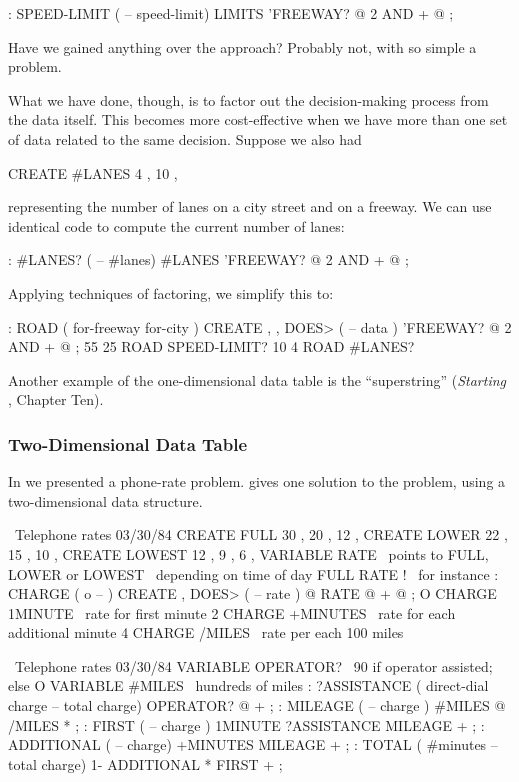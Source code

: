 \begin{Code}
: SPEED-LIMIT  ( -- speed-limit)
     LIMITS  'FREEWAY? @  2 AND  +  @ ;
\end{Code}
Have we gained anything over the  approach? Probably not,
with so simple a problem.

What we have done, though, is to factor out the decision-making
process from the data itself. This becomes more cost-effective when we
have more than one set of data related to the same decision. Suppose we
also had

\begin{Code}
CREATE #LANES   4 ,  10 ,
\end{Code}
representing the number of lanes on a city street and on a freeway. We
can use identical code to compute the current number of lanes:

\begin{Code}
: #LANES?  ( -- #lanes)
     #LANES  'FREEWAY? @  2 AND  +  @ ;
\end{Code}
Applying techniques of factoring, we simplify this to:

\begin{Code}
: ROAD  ( for-freeway for-city ) CREATE , ,
     DOES> ( -- data )  'FREEWAY? @  2 AND  +  @ ;
55 25 ROAD SPEED-LIMIT?
10  4 ROAD #LANES?
\end{Code}
Another example of the one-dimensional data table is the ``superstring''
(\emph{Starting \Forth{}}, Chapter Ten).

\subsubsection{Two-Dimensional Data Table}
In  we presented a phone-rate problem.  gives one
solution to the problem, using a two-dimensional data structure.

\begin{figure*}[bbbt]
\begin{Screen}
\ Telephone rates                                       03/30/84
CREATE FULL     30 , 20 , 12 ,
CREATE LOWER    22 , 15 , 10 ,
CREATE LOWEST   12 ,  9 ,  6 ,
VARIABLE RATE   \ points to FULL, LOWER or LOWEST
                \ depending on time of day
FULL RATE !  \ for instance
: CHARGE   ( o -- ) CREATE ,
   DOES>  ( -- rate )  @  RATE @ +  @ ;
O CHARGE 1MINUTE   \ rate for first minute
2 CHARGE +MINUTES  \ rate for each additional minute
4 CHARGE /MILES    \ rate per each 100 miles
\end{Screen}

\begin{Screen}
\ Telephone rates                                       03/30/84
VARIABLE OPERATOR?  \ 90 if operator assisted; else O
VARIABLE #MILES  \ hundreds of miles
: ?ASSISTANCE  ( direct-dial charge -- total charge)
   OPERATOR? @  + ;
: MILEAGE  ( -- charge )  #MILES @  /MILES * ;
: FIRST  ( -- charge )  1MINUTE  ?ASSISTANCE  MILEAGE + ;
: ADDITIONAL  ( -- charge)  +MINUTES  MILEAGE + ;
: TOTAL ( #minutes -- total charge)
   1- ADDITIONAL *  FIRST + ;
\end{Screen}
\end{figure*}

